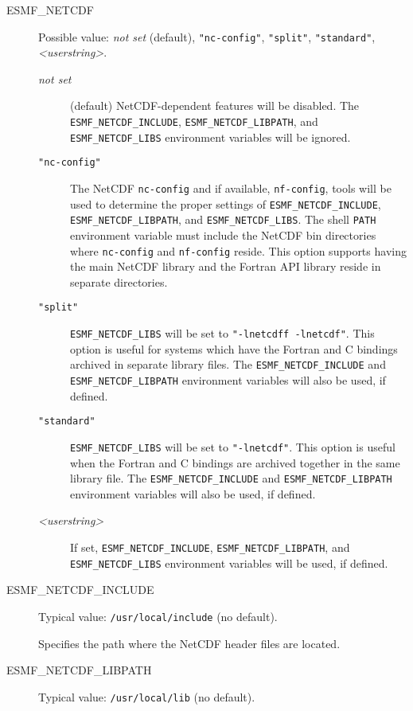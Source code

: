 \begin{description}

\item[ESMF\_NETCDF] Possible value: {\it not set} (default), {\tt "nc-config"}, {\tt "split"}, 
{\tt "standard"}, {\it <userstring>}.

\begin{description}
\item[{\it not set}] (default) NetCDF-dependent features will be disabled.
The {\tt ESMF\_NETCDF\_INCLUDE}, {\tt ESMF\_NETCDF\_LIBPATH}, and
{\tt ESMF\_NETCDF\_LIBS} environment variables will be ignored.

\item[{\tt "nc-config"}] The NetCDF {\tt nc-config} and if available, {\tt nf-config},
tools will be used to determine the proper settings of {\tt ESMF\_NETCDF\_INCLUDE},
{\tt ESMF\_NETCDF\_LIBPATH}, and {\tt ESMF\_NETCDF\_LIBS}.  The shell {\tt PATH}
environment variable must include the NetCDF bin directories where {\tt nc-config}
and {\tt nf-config} reside.  This option supports having the main NetCDF library and the
Fortran API library reside in separate directories.

\item[{\tt "split"}] {\tt ESMF\_NETCDF\_LIBS} will be set to 
{\tt "-lnetcdff -lnetcdf"}.  This option is useful for systems 
which have the Fortran and C bindings archived in separate library files.  
The {\tt ESMF\_NETCDF\_INCLUDE} and {\tt ESMF\_NETCDF\_LIBPATH}
environment variables will also be used, if defined.

\item[{\tt "standard"}] {\tt ESMF\_NETCDF\_LIBS} will be set to 
{\tt "-lnetcdf"}.  This option is useful when the Fortran and 
C bindings are archived together in the same library file.  The {\tt ESMF\_NETCDF\_INCLUDE} 
and {\tt ESMF\_NETCDF\_LIBPATH} environment variables will also be used, 
if defined.

\item[{\it <userstring>}] If set, {\tt ESMF\_NETCDF\_INCLUDE}, 
{\tt ESMF\_NETCDF\_LIBPATH}, and {\tt ESMF\_NETCDF\_LIBS} environment 
variables will be used, if defined.
\end{description}

\item[ESMF\_NETCDF\_INCLUDE] Typical value: {\tt /usr/local/include} 
(no default).

Specifies the path where the NetCDF header files are located.

\item[ESMF\_NETCDF\_LIBPATH] Typical value: {\tt /usr/local/lib} (no default).


\end{description}
